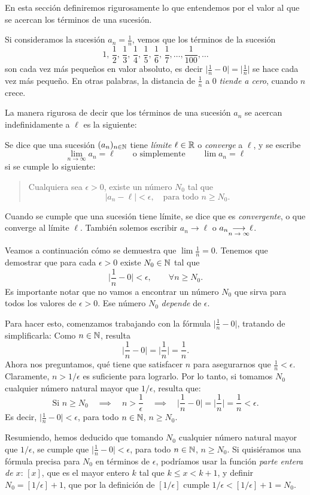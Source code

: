 En esta sección definiremos rigurosamente lo que entendemos por el valor al que se acercan los términos de una sucesión. 

Si consideramos la sucesión $a_n = \frac1n$, vemos que los términos de la sucesión
\[
1,\,\frac12,\,\frac13,\,\frac14,\,\frac15,\,\frac16,\,\frac17,\dots,\frac1{100},\dots
\]
son cada vez más pequeños en valor absoluto, es decir $\Big|\frac1n - 0\Big| = \Big|\frac1n\Big|$ se hace cada vez más pequeño. En otras palabras, la distancia de $\frac1n$ a $0$ \emph{tiende a cero}, cuando $n$ crece.

La manera rigurosa de decir que los términos de una sucesión $a_n$ se acercan indefinidamente a $\ell$ es la siguiente:

\begin{definition}
    Se dice que una sucesión $(a_n)_{n\in\mathbb{N}}$ tiene \emph{límite} $\ell\in\mathbb{R}$ o \emph{converge} a $\ell$, y se escribe
    \[
    \lim_{n\to\infty} a_n = \ell
    \qquad\text{o simplemente}\qquad
    \lim a_n = \ell
    \]
    si se cumple lo siguiente:
    \begin{quote}
        Cualquiera sea $\epsilon > 0$, existe un número $N_0$ tal que
        \[
            |a_n - \ell| < \epsilon, \quad \text{para todo $n\ge N_0$}.
        \]
    \end{quote}
    Cuando se cumple que una sucesión tiene límite, se dice que es \emph{convergente}, o que converge al límite $\ell$.
    También solemos escribir $a_n \to \ell$ o 
    $a_n \ton \ell$.
\end{definition}

\begin{example}
    Veamos a continuación cómo se demuestra que $\lim \frac1n = 0$.
    Tenemos que demostrar que para cada $\epsilon>0$ existe $N_0\in\mathbb{N}$ tal que 
\[
\Big|\frac1n-0\Big| < \epsilon, \qquad \forall n \ge N_0.
\]
Es importante notar que no vamos a encontrar un número $N_0$ que sirva para todos los valores de $\epsilon > 0$. Ese número $N_0$ \emph{depende} de $\epsilon$. 

Para hacer esto, comenzamos trabajando con la fórmula $\Big|\frac1n-0\Big|$, tratando de simplificarla: Como $n\in\mathbb{N}$, resulta
\[
    \Big|\frac1n-0\Big| = \Big|\frac1n\Big| = \frac1n.
\]
Ahora nos preguntamos, qué tiene que satisfacer $n$ para asegurarnos que $\frac1n < \epsilon$.
Claramente, $n > 1/\epsilon$ es suficiente para lograrlo. Por lo tanto, si tomamos $N_0$ cualquier número natural mayor que $1/\epsilon$, resulta que:
\[
\text{Si }n \ge N_0 \quad\implies\quad n>\frac1\epsilon \quad\implies\quad \Big|\frac1n-0\Big| = \Big|\frac1n\Big| = \frac1n<\epsilon.
\]
Es decir, $\Big|\frac1n-0\Big| < \epsilon$, para todo $n\in\mathbb{N}$, $n \ge N_0$.

Resumiendo, hemos deducido que tomando $N_0$ cualquier número natural mayor que $1/\epsilon$, se cumple que $\Big|\frac1n-0\Big| < \epsilon$, para todo $n\in\mathbb{N}$, $n \ge N_0$.
Si quisiéramos una fórmula precisa para $N_0$ en términos de $\epsilon$, podríamos usar la función \emph{parte entera de $x$}: $[x]$, que es el mayor entero $k$ tal que $k\le x<k+1$, y definir $N_0 = [1/\epsilon]+1$, que por la definición de $[1/\epsilon]$ cumple $1/\epsilon < [1/\epsilon]+1=N_0$.
\end{example}

